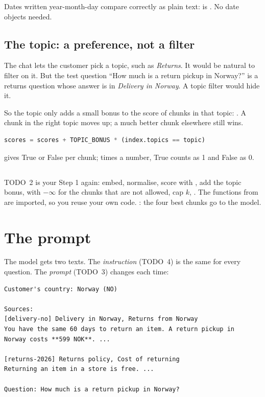 \documentclass[11pt]{article}
\begin{document}
\begin{keypoint}
Dates written year-month-day compare correctly as plain text:
 is . No date objects
needed.
\end{keypoint}

\subsection{The topic: a preference, not a filter}

The chat lets the customer pick a topic, such as \emph{Returns}. It
would be natural to filter on it. But the test question ``How much is a
return pickup in Norway?'' is a returns question whose answer is in
\emph{Delivery in Norway}. A topic filter would hide it.

So the topic only adds a small bonus to the score of chunks in that
topic: . A chunk in the right topic moves up;
a much better chunk elsewhere still wins.
\begin{lstlisting}[language=Python]
scores = scores + TOPIC_BONUS * (index.topics == topic)
\end{lstlisting}
 gives True or False per chunk; times a
number, True counts as 1 and False as 0.

\subsection{}

TODO~2 is your Step 1  again: embed, normalise, score with
, add the topic bonus,  with $-\infty$ for the
chunks that are not allowed, cap $k$, . The functions
from  are imported, so you reuse your own code.
: the four best chunks go to the model.

\section{The prompt}

The model gets two texts. The \emph{instruction} (TODO~4) is the same
for every question. The \emph{prompt} (TODO~3) changes each time:
\begin{lstlisting}
Customer's country: Norway (NO)

Sources:
[delivery-no] Delivery in Norway, Returns from Norway
You have the same 60 days to return an item. A return pickup in
Norway costs **599 NOK**. ...

[returns-2026] Returns policy, Cost of returning
Returning an item in a store is free. ...

Question: How much is a return pickup in Norway?
\end{lstlisting}
\end{document}
